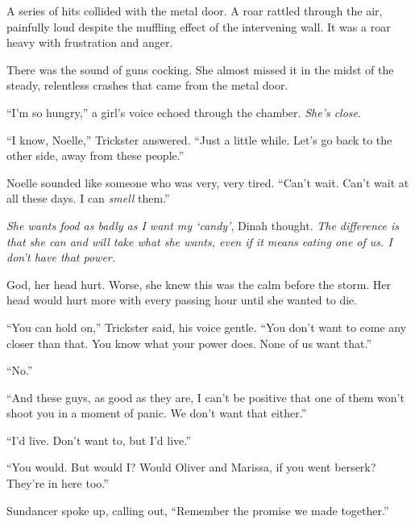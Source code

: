 A series of hits collided with the metal door.  A roar rattled through the air, painfully loud despite the muffling effect of the intervening wall.  It was a roar heavy with frustration and anger.



There was the sound of guns cocking.  She almost missed it in the midst of the steady, relentless crashes that came from the metal door.



``I'm so hungry,'' a girl's voice echoed through the chamber.  \emph{She's close}.



``I know, Noelle,'' Trickster answered.  ``Just a little while.  Let's go back to the other side, away from these people.''



Noelle sounded like someone who was very, very tired.  ``Can't wait.  Can't wait at all these days.  I can \emph{smell} them.''



\emph{She wants food as badly as I want my `candy'}, Dinah thought.  \emph{The difference is that she can and will take what she wants, even if it means eating one of us.  I don't have that power.}



God, her head hurt.  Worse, she knew this was the calm before the storm.  Her head would hurt more with every passing hour until she wanted to die.



``You can hold on,'' Trickster said, his voice gentle.  ``You don't want to come any closer than that.  You know what your power does.  None of us want that.''



``No.''



``And these guys, as good as they are, I can't be positive that one of them won't shoot you in a moment of panic.  We don't want that either.''



``I'd live.  Don't want to, but I'd live.''



``You would.  But would I?  Would Oliver and Marissa, if you went berserk?  They're in here too.''



Sundancer spoke up, calling out, ``Remember the promise we made together.''



